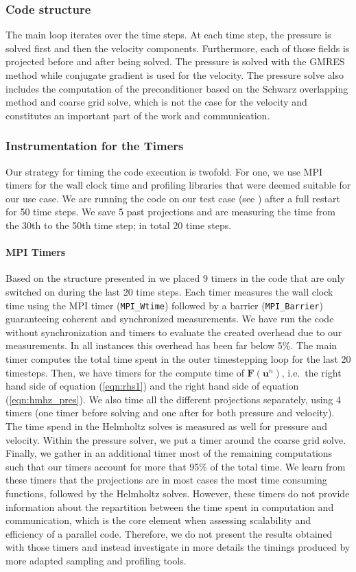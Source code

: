\documentclass{sig-alternate}
\begin{document}
\subsubsection{Code structure}
\label{sec:code}

The main loop iterates over the time steps. At each time step, the pressure is solved first and then the velocity components. Furthermore, each of those fields is projected before and after being solved. The pressure is solved with the GMRES method while conjugate gradient is used for the velocity. The pressure solve also includes the computation of the preconditioner based on the Schwarz overlapping method and coarse grid solve, which is not the case for the velocity and constitutes an important part of the work and communication.

\subsubsection{Instrumentation for the Timers}
\label{sec:timers}
Our strategy for timing the code execution is twofold. For one, we use MPI
timers for the wall clock time and profiling libraries that were deemed suitable
for our use case. We are running the code on our test case (see
) after a full restart for 50 time steps. We save 5 past
projections and are measuring the time from the 30th to the 50th time step; in
total 20 time steps. 
\paragraph{MPI Timers}
Based on the structure presented in  we placed 9 timers in the code that are
only switched on during the last 20 time steps. Each timer measures the wall
clock time using the MPI timer ({\tt MPI\_Wtime}) followed by a barrier
({\tt MPI\_Barrier}) guaranteeing coherent and synchronized measurements. We
have run the code without synchronization and timers to evaluate the created
overhead due to our measurements. In all instances this overhead has been far
below 5\%. The main timer computes the total time spent in the outer timestepping loop for the last 20 timesteps. Then, we have timers for the compute time of $\mathbf{F} \left( \mathbf{u}^{n} \right)$, i.e.\ the right hand side of equation (\ref{eqn:rhs1}) and the right hand side of equation (\ref{eqn:hmhz_pres}). We also time all the different projections separately, using 4 timers (one timer before solving and one after for both pressure and velocity). The time spend in the Helmholtz solves is measured as well for pressure and velocity. Within the pressure solver, we put a timer around the coarse grid solve. Finally, we gather in an additional timer most of the remaining computations such that our timers account for more that 95\% of the total time. We learn from these timers that the projections are in most cases the most time consuming functions, followed by the Helmholtz solves. However, these timers do not provide information about the repartition between the time spent in computation and communication, which is the core element when assessing scalability and efficiency of a parallel code. Therefore, we do not present the results obtained with those timers and instead investigate in more details the timings produced by more adapted sampling and profiling tools.
\end{document}
